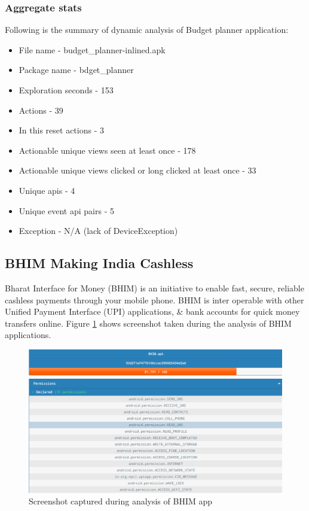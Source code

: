 \subsubsection{Aggregate stats}
Following is the summary of dynamic analysis of Budget planner application:
\begin{itemize}
    \item File name - budget\_planner-inlined.apk
\item Package name - bdget\_planner
\item Exploration seconds - 153
\item Actions - 39
\item In this reset actions - 3
\item Actionable unique views seen at least once - 178
\item Actionable unique views clicked or long clicked at least once - 33
\item Unique apis - 4
\item Unique event api pairs - 5
\item Exception - N/A (lack of DeviceException)

\end{itemize}

\subsection{BHIM Making India Cashless}
Bharat Interface for Money (BHIM) is an initiative to enable fast, secure, reliable cashless payments through your mobile phone. BHIM is inter operable with other Unified Payment Interface (UPI) applications, & bank accounts for quick money transfers online.
Figure \ref{fig:bhim} shows screenshot taken during the analysis of BHIM applications.
\begin{figure}[!h]
  \centering
  \includegraphics [scale=0.5] {bhim.png}
  \caption{Screenshot captured during analysis of BHIM app}
  \label{fig:bhim}
\end{figure}
